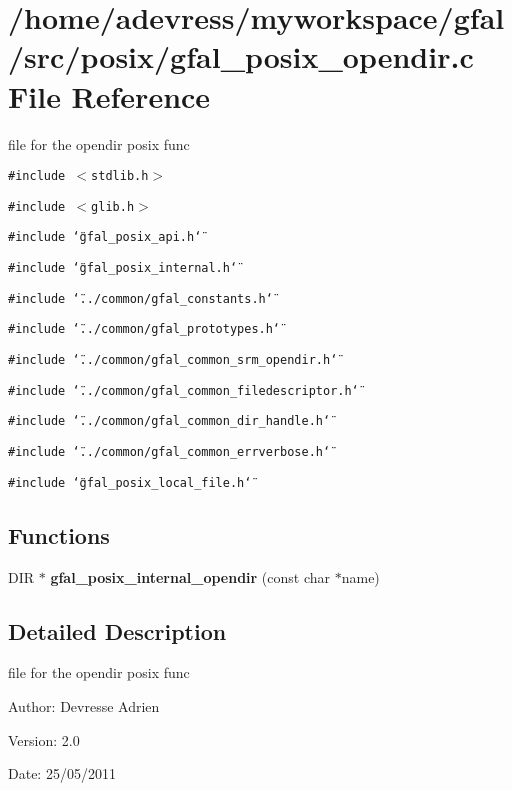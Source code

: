 \section{/home/adevress/myworkspace/gfal/src/posix/gfal\_\-posix\_\-opendir.c File Reference}
\label{gfal__posix__opendir_8c}
file for the opendir posix func 

{\tt \#include $<$stdlib.h$>$}\par
{\tt \#include $<$glib.h$>$}\par
{\tt \#include \char`\"{}gfal\_\-posix\_\-api.h\char`\"{}}\par
{\tt \#include \char`\"{}gfal\_\-posix\_\-internal.h\char`\"{}}\par
{\tt \#include \char`\"{}../common/gfal\_\-constants.h\char`\"{}}\par
{\tt \#include \char`\"{}../common/gfal\_\-prototypes.h\char`\"{}}\par
{\tt \#include \char`\"{}../common/gfal\_\-common\_\-srm\_\-opendir.h\char`\"{}}\par
{\tt \#include \char`\"{}../common/gfal\_\-common\_\-filedescriptor.h\char`\"{}}\par
{\tt \#include \char`\"{}../common/gfal\_\-common\_\-dir\_\-handle.h\char`\"{}}\par
{\tt \#include \char`\"{}../common/gfal\_\-common\_\-errverbose.h\char`\"{}}\par
{\tt \#include \char`\"{}gfal\_\-posix\_\-local\_\-file.h\char`\"{}}\par
\subsection*{Functions}
\begin{CompactItemize}
\item 
DIR $\ast$ \textbf{gfal\_\-posix\_\-internal\_\-opendir} (const char $\ast$name)\label{gfal__posix__opendir_8c_b2e2608cd7c4ff0cecf68e04923d93cc}

\end{CompactItemize}


\subsection{Detailed Description}
file for the opendir posix func 

\begin{Desc}
\item[Author:]Devresse Adrien \end{Desc}
\begin{Desc}
\item[Version:]2.0 \end{Desc}
\begin{Desc}
\item[Date:]25/05/2011 \end{Desc}
